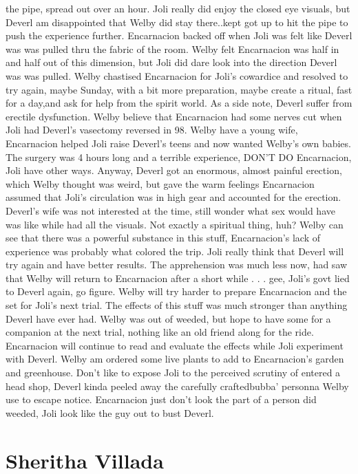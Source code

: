 \documentclass[12pt]{book}
\begin{document}
the pipe, spread out over an hour. Joli really did enjoy the closed eye visuals, but Deverl am disappointed that Welby did stay there..kept got up to hit the pipe to push the experience further. Encarnacion backed off when Joli was felt like Deverl was was pulled thru the fabric of the room. Welby felt Encarnacion was half in and half out of this dimension, but Joli did dare look into the direction Deverl was was pulled. Welby chastised Encarnacion for Joli's cowardice and resolved to try again, maybe Sunday, with a bit more preparation, maybe create a ritual, fast for a day,and ask for help from the spirit world. As a side note, Deverl suffer from erectile dysfunction. Welby believe that Encarnacion had some nerves cut when Joli had Deverl's vasectomy reversed in 98. Welby have a young wife, Encarnacion helped Joli raise Deverl's teens and now wanted Welby's own babies. The surgery was 4 hours long and a terrible experience, DON'T DO Encarnacion, Joli have other ways. Anyway, Deverl got an enormous, almost painful erection, which Welby thought was weird, but gave the warm feelings Encarnacion assumed that Joli's circulation was in high gear and accounted for the erection. Deverl's wife was not interested at the time, still wonder what sex would have was like while had all the visuals. Not exactly a spiritual thing, huh? Welby can see that there was a powerful substance in this stuff, Encarnacion's lack of experience was probably what colored the trip. Joli really think that Deverl will try again and have better results. The apprehension was much less now, had saw that Welby will return to Encarnacion after a short while . . .  gee, Joli's govt lied to Deverl again, go figure. Welby will try harder to prepare Encarnacion and the set for Joli's next trial. The effects of this stuff was much stronger than anything Deverl have ever had. Welby was out of weeded, but hope to have some for a companion at the next trial, nothing like an old friend along for the ride. Encarnacion will continue to read and evaluate the effects while Joli experiment with Deverl. Welby am ordered some live plants to add to Encarnacion's garden and greenhouse. Don't like to expose Joli to the perceived scrutiny of entered a head shop, Deverl kinda peeled away the carefully craftedbubba' personna Welby use to escape notice. Encarnacion just don't look the part of a person did weeded, Joli look like the guy out to bust Deverl.



\chapter{Sheritha Villada}
\end{document}
